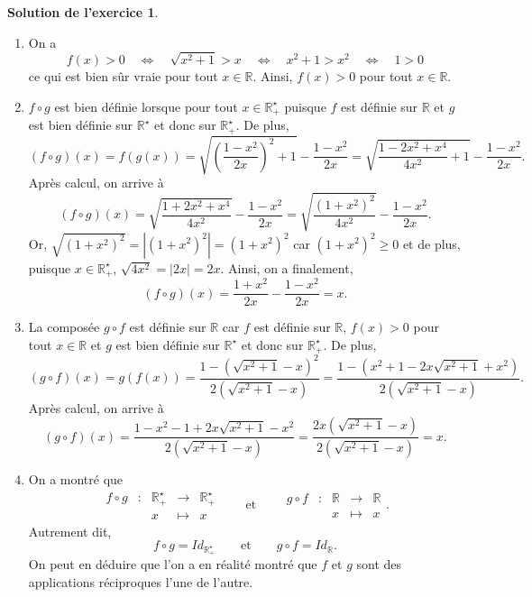 \documentclass[a4paper, 11pt,openany]{article}%
\theoremstyle{plain}
\theoremstyle{definition}
\newtheorem{sol}{Solution de l'exercice}
\theoremstyle{remark}
\newcommand{\R}{\mathbb{R}}
\begin{document}
\begin{sol}
\begin{enumerate}
\item On a
\[ f(x) > 0 \quad \Leftrightarrow \quad \sqrt{x^2+1} > x \quad \Leftrightarrow \quad  x^2 + 1 > x^2 \quad \Leftrightarrow \quad 1 > 0\]
ce qui est bien sûr vraie pour tout $x \in \R$. Ainsi, $f(x) > 0$ pour tout $x \in \R$.
\item $f\circ g$ est bien définie lorsque pour tout $x \in \R_+^{\star}$ puisque $f$ est définie sur $\R$ et $g$ est bien définie sur $\R^{\star}$ et donc sur $\R_+^{\star}$. De plus,
\[ (f \circ g)(x) = f(g(x)) = \sqrt{\left(\frac{1-x^2}{2x} \right)^2+1} - \frac{1-x^2}{2x} = \sqrt{\frac{1-2x^2+x^4}{4x^2} +1} - \frac{1-x^2}{2x}  .\]
Après calcul, on arrive à
\[ (f \circ g)(x)  = \sqrt{\frac{1+2x^2+x^4}{4x^2}} - \frac{1-x^2}{2x} =\sqrt{\frac{(1+x^2)^2}{4x^2}} - \frac{1-x^2}{2x}.\]
Or, $\sqrt{(1+x^2)^2} = |(1 +x^2)^2| = (1+x^2)^2$ car $(1+x^2)^2 \geqslant 0$ et de plus, puisque $x \in \R_+^{\star}$, $\sqrt{4x^2} = |2x| = 2x$. Ainsi, on a finalement,
\[ (f \circ g)(x)  =\frac{1+x^2}{2x} - \frac{1-x^2}{2x} = x.\]
\item La composée $ g \circ f$ est définie sur $\R$ car $f$ est définie sur $\R$, $f(x) > 0$ pour tout $x \in \R$ et $g$ est bien définie sur $\R^{\star}$ et donc sur $\R_+^{\star}$. De plus,
\[ (g \circ f)(x) = g(f(x)) = \frac{1-(\sqrt{x^2+1} - x)^2}{2(\sqrt{x^2+1} - x)} =  \frac{1-(x^2+1 -2 x\sqrt{x^2 +1} +x^2)}{2(\sqrt{x^2+1} - x)} .\]
Après calcul, on arrive à
\[ (g \circ f)(x) =  \frac{1-x^2-1 +2 x\sqrt{x^2 +1} -x^2}{2(\sqrt{x^2+1} - x)} = \frac{2x (\sqrt{x^2 +1}-x) }{2(\sqrt{x^2+1} - x)} =x.\]
\item On a montré que
\[  \begin{array}{ccccc}
f\circ g & : & \R_+^{\star} & \to & \R_+^{\star}  \\
 & & x & \mapsto & x
\end{array} \quad \quad \text{et} \quad \quad \begin{array}{ccccc}
g\circ f & : & \R & \to & \R \\
 & & x & \mapsto & x
\end{array} .\]
Autrement dit,
\[ 
f\circ g = Id_{\R_+^{\star}} \quad \quad \text{et} \quad \quad g \circ f = Id_{\R} .\]
On peut en déduire que l'on a en réalité montré que $f$ et $g$ sont des applications réciproques l'une de l'autre.
\end{enumerate}

\end{sol}
\end{document}
